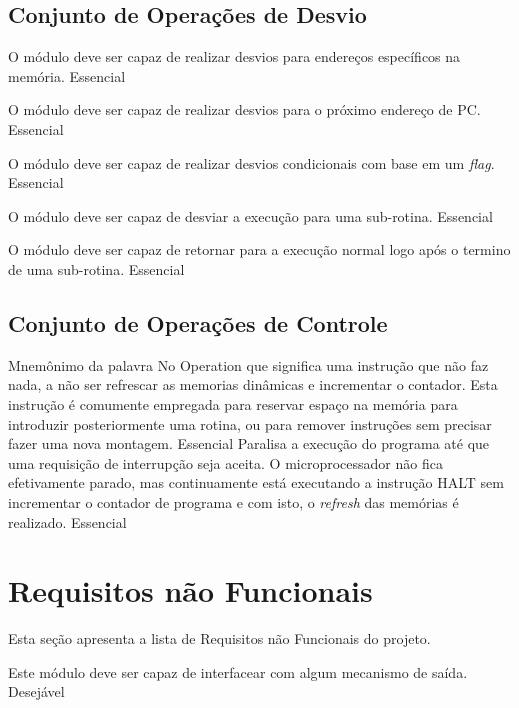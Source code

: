 \documentclass{article}
\begin{document}
    \subsection{Conjunto de Operações de Desvio}
	    
	  \begin{functional}
		{O módulo deve ser capaz de realizar desvios para endereços específicos na memória.}
		{Essencial} 
		 
		 {O módulo deve ser capaz de realizar desvios para o próximo endereço de PC.}
		 {Essencial}
		 
		 {O módulo deve ser capaz de realizar desvios condicionais com base em um \textit{flag}.}
		 {Essencial}
		 
		 {O módulo deve ser capaz de desviar a execução para uma sub-rotina.}
		 {Essencial}
		 
		 {O módulo deve ser capaz de retornar para a execução normal logo após o  termino de uma sub-rotina.}
		 {Essencial}
         
	  \end{functional}
      
 
 
          \subsection{Conjunto de Operações de Controle}
	    
	  \begin{functional}
		\requirement{Operação NOP}
		{Mnemônimo da palavra No Operation que significa uma instrução que não faz nada, a não ser refrescar as memorias dinâmicas e incrementar o contador. Esta instrução é comumente empregada para reservar espaço na memória para introduzir posteriormente uma rotina, ou para remover instruções sem precisar fazer uma nova montagem.}
		{Essencial} 
        {Paralisa a execução do programa até que uma requisição de interrupção seja aceita. O microprocessador não fica efetivamente parado, mas continuamente está executando a instrução HALT sem incrementar o contador de programa e com isto, o \textit{refresh} das memórias é realizado.}
        {Essencial}
         
	  \end{functional}
	  
  \section{Requisitos não Funcionais}
  Esta seção apresenta a lista de Requisitos não Funcionais do projeto.
  \begin{nonfunctional}
  	
  {Este módulo deve ser capaz de interfacear com algum mecanismo de saída.}
  {Desejável}
  
  \end{nonfunctional}
  
\end{document}
